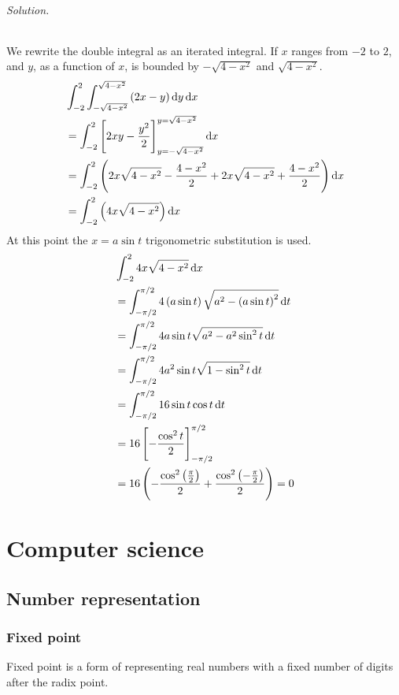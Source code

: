 \documentclass[12pt, oneside]{book}
\begin{document}
\paragraph{Solution.} We rewrite the double integral as an iterated integral.
If \(x\) ranges from \(-2\) to \(2\), and \(y\), as a function of \(x\), is
bounded by \(-\sqrt{4 - x^2}\) and \(\sqrt{4 - x^2}\).
\begin{align*}
    &\int_{-2}^{2} \int_{-\sqrt{4 - x^2}}^{\sqrt{4 - x^2}} {\left(2x - y\right) \dif y} \dif x \\
    &= \int_{-2}^{2} \left[ 2xy - \frac{y^2}{2} \right]_{y = -\sqrt{4 - x^2}}^{y = \sqrt{4 - x^2}} \dif x \\
    &= \int_{-2}^{2} \left( 2x\sqrt{4 - x^2} - \frac{4 - x^2}{2} + 2x\sqrt{4 - x^2} + \frac{4 - x^2}{2} \right) \dif x \\
    &= \int_{-2}^{2} \left( 4x\sqrt{4 - x^2} \right) \dif x
\end{align*}
At this point the \(x = a\sin{t}\) trigonometric substitution is used.
\begin{align*}
    &\int_{-2}^{2} 4x\sqrt{4 - x^2} \dif x \\
    &=\int_{-\pi/2}^{\pi/2} 4 \left(a \sin{t}\right) \sqrt{a^2 - \left(a \sin{t}\right)^2} \dif t \\
    &=\int_{-\pi/2}^{\pi/2} 4 a \sin{t} \sqrt{a^2 - a^2\sin^2{t}} \dif t \\
    &=\int_{-\pi/2}^{\pi/2} 4 a^2 \sin{t} \sqrt{1 - \sin^2{t}} \dif t \\
    &=\int_{-\pi/2}^{\pi/2} 16 \sin{t} \cos{t} \dif t \\
    &=16 \left[ - \frac{\cos^2{t}}{2} \right]_{-\pi/2}^{\pi/2} \\
    &=16 \left( - \frac{\cos^2{\left(\frac{\pi}{2}\right)}}{2} + \frac{\cos^2{\left(-\frac{\pi}{2}\right)}}{2} \right) = 0
\end{align*}

\part{Computer science}

\chapter{Number representation}

\section{Fixed point}
Fixed point is a form of representing real numbers with a fixed number of digits
after the radix point.
\end{document}
